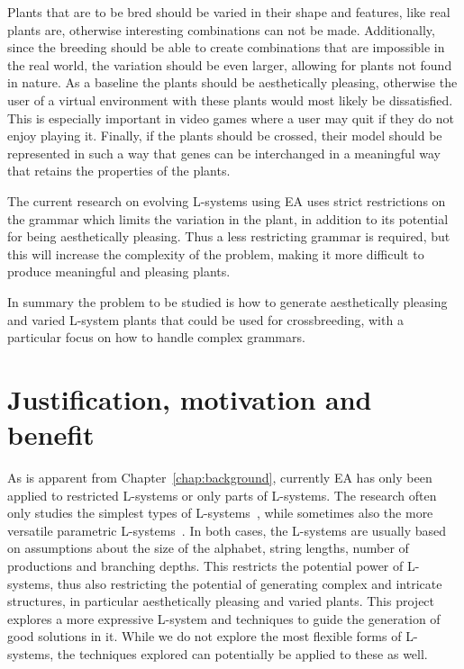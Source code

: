 Plants that are to be bred should be varied in their shape and features, like real plants are, otherwise interesting combinations can not be made.
Additionally, since the breeding should be able to create combinations that are impossible in the real world, the variation should be even larger, allowing for plants not found in nature.
As a baseline the plants should be aesthetically pleasing, otherwise the user of a virtual environment with these plants would most likely be dissatisfied.
This is especially important in video games where a user may quit if they do not enjoy playing it.
Finally, if the plants should be crossed, their model should be represented in such a way that genes can be interchanged in a meaningful way that retains the properties of the plants.

The current research on evolving \glspl{L-system} using \gls{EA} uses strict restrictions on the grammar which limits the variation in the plant, in addition to its potential for being aesthetically pleasing. %
Thus a less restricting grammar is required, but this will increase the complexity of the problem, making it more difficult to produce meaningful and pleasing plants.

In summary the problem to be studied is how to generate aesthetically pleasing and varied \gls{L-system} plants that could be used for crossbreeding, with a particular focus on how to handle complex grammars.

\section{Justification, motivation and benefit}
As is apparent from Chapter~\ref{chap:background}, currently \gls{EA} has only been applied to restricted L-systems or only parts of L-systems.
The research often only studies the simplest types of L-systems~\cite{1998Mock,1998Ochoa,2002Ebner,2003Ebner,2006Ashlock,2009Beaumont,2009Corchado}, while sometimes also the more versatile parametric L-systems~\cite{1994Jacob,2000Vanak,2001Hornby}.
In both cases, the L-systems are usually based on assumptions about the size of the alphabet, string lengths, number of productions and branching depths.
This restricts the potential power of L-systems, thus also restricting the potential of generating complex and intricate structures, in particular aesthetically pleasing and varied plants.
This project explores a more expressive L-system and techniques to guide the generation of good solutions in it.
While we do not explore the most flexible forms of L-systems, the techniques explored can potentially be applied to these as well.

